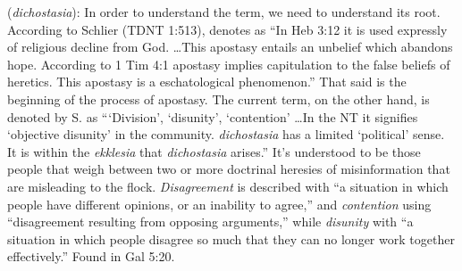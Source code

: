\item[Disunity,]

(\textit{dichostasia}):
In order to understand the term, we need to understand its root. According to Schlier (TDNT 1:513),  denotes as ``In Heb 3:12 it is used expressly of religious decline from God. \ldots This apostasy entails an unbelief which abandons hope. According to 1 Tim 4:1 apostasy implies capitulation to the false beliefs of heretics. This apostasy is a eschatological phenomenon.'' That said is the beginning of the process of apostasy. The current term, on the other hand, is denoted by S. as ```Division', `disunity', `contention' \ldots In the NT it signifies `objective disunity' in the community. \emph{dichostasia} has a limited `political' sense. It is within the \emph{ekklesia} that \emph{dichostasia} arises.'' It's understood to be those people that weigh between two or more doctrinal heresies of misinformation that are misleading to the flock. \emph{Disagreement} is described with ``a situation in which people have different opinions, or an inability to agree,'' and \emph{contention} using ``disagreement resulting from opposing arguments,'' while \emph{disunity} with ``a situation in which people disagree so much that they can no longer work together effectively.''
Found in Gal 5:20.

